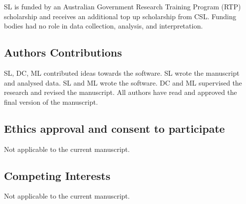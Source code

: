 \documentclass[]{article}
\begin{document}
SL is funded by an Australian Government Research Training Program (RTP)
scholarship and receives an additional top up scholarship from CSL.
Funding bodies had no role in data collection, analysis, and
interpretation.

\hypertarget{authors-contributions}{%
\subsection{Authors Contributions}\label{authors-contributions}}

SL, DC, ML contributed ideas towards the software. SL wrote the
manuscript and analysed data. SL and ML wrote the software. DC and ML
supervised the research and revised the manuscript. All authors have
read and approved the final version of the manuscript.

\hypertarget{ethics-approval-and-consent-to-participate}{%
\subsection{Ethics approval and consent to
participate}\label{ethics-approval-and-consent-to-participate}}

Not applicable to the current manuscript.

\hypertarget{competing-interests}{%
\subsection{Competing Interests}\label{competing-interests}}

Not applicable to the current manuscript.




\newpage
\singlespacing 
\printbibliography[title=References]
\end{document}
